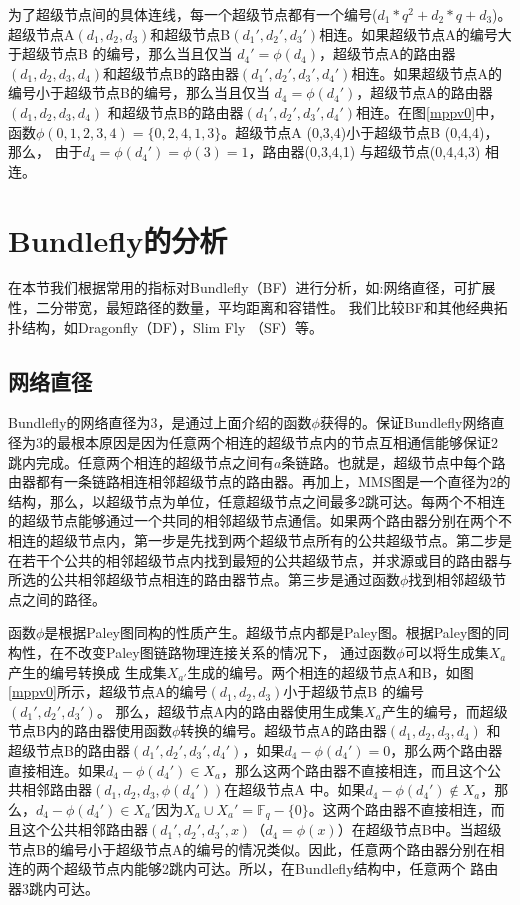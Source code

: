 为了超级节点间的具体连线，每一个超级节点都有一个编号($d_{1}*q^2+d_{2}*q+d_{3}$)。超级节点A$(d_{1},d_{2},d_{3})$和超级节点B$(d_{1}',d_{2}',d_{3}')$相连。如果超级节点A的编号大于超级节点B 的编号，那么当且仅当 $d_{4}'=\phi(d_{4})$，超级节点A的路由器$(d_{1},d_{2},d_{3},d_{4})$和超级节点B的路由器$(d_{1}',d_{2}',d_{3}',d_{4}')$相连。如果超级节点A的编号小于超级节点B的编号，那么当且仅当 $d_{4}=\phi(d_{4}')$，超级节点A的路由器$(d_{1},d_{2},d_{3},d_{4})$ 和超级节点B的路由器$(d_{1}',d_{2}',d_{3}',d_{4}')$相连。在图\ref{mppv0}中，  函数$\phi(0,1,2,3,4)=\{0,2,4,1,3\}$。超级节点A (0,3,4)小于超级节点B (0,4,4)，那么， 由于$d_{4}=\phi(d_{4}')=\phi(3)=1$，路由器(0,3,4,1) 与超级节点(0,4,4,3) 相连。

\section{Bundlefly的分析}
在本节我们根据常用的指标对Bundlefly（BF）进行分析，如:网络直径，可扩展性，二分带宽，最短路径的数量，平均距离和容错性。
我们比较BF和其他经典拓扑结构，如Dragonfly（DF），Slim Fly （SF）等。

\subsection{网络直径}

Bundlefly的网络直径为3，是通过上面介绍的函数$\phi$获得的。保证Bundlefly网络直径为3的最根本原因是因为任意两个相连的超级节点内的节点互相通信能够保证2 跳内完成。任意两个相连的超级节点之间有$a$条链路。也就是，超级节点中每个路由器都有一条链路相连相邻超级节点的路由器。再加上，MMS图是一个直径为2的结构，那么，以超级节点为单位，任意超级节点之间最多2跳可达。每两个不相连的超级节点能够通过一个共同的相邻超级节点通信。如果两个路由器分别在两个不相连的超级节点内，第一步是先找到两个超级节点所有的公共超级节点。第二步是在若干个公共的相邻超级节点内找到最短的公共超级节点，并求源或目的路由器与
所选的公共相邻超级节点相连的路由器节点。第三步是通过函数$\phi$找到相邻超级节点之间的路径。

函数$\phi$是根据Paley图同构的性质产生。超级节点内都是Paley图。根据Paley图的同构性，在不改变Paley图链路物理连接关系的情况下，
通过函数$\phi$可以将生成集$X_{a}$ 产生的编号转换成
生成集$X_{a'}$生成的编号。两个相连的超级节点A和B，如图\ref{mppv0}所示，超级节点A的编号$(d_{1},d_{2},d_{3})$小于超级节点B 的编号$(d_{1}',d_{2}',d_{3}')$。 那么，超级节点A内的路由器使用生成集$X_{a}$产生的编号，而超级节点B内的路由器使用函数$\phi$转换的编号。超级节点A的路由器$(d_{1},d_{2},d_{3},d_{4})$ 和超级节点B的路由器$(d_{1}',d_{2}',d_{3}',d_{4}')$，如果$d_{4}-\phi(d_{4}')=0$，那么两个路由器直接相连。如果$d_{4}-\phi(d_{4}')\in X_{a}$，那么这两个路由器不直接相连，而且这个公共相邻路由器$(d_{1},d_{2},d_{3},\phi(d_{4}'))$在超级节点A 中。如果$d_{4}-\phi(d_{4}') \notin X_{a}$，那么，$d_{4}-\phi(d_{4}')\in X_{a}'$因为$X_{a} \cup X_{a}'=\mathds{F}_q-\{0\}$。这两个路由器不直接相连，而且这个公共相邻路由器$(d_{1}',d_{2}',d_{3}',x)$（$d_{4}=\phi(x)$）在超级节点B中。当超级节点B的编号小于超级节点A的编号的情况类似。因此，任意两个路由器分别在相连的两个超级节点内能够2跳内可达。所以，在Bundlefly结构中，任意两个
路由器3跳内可达。

